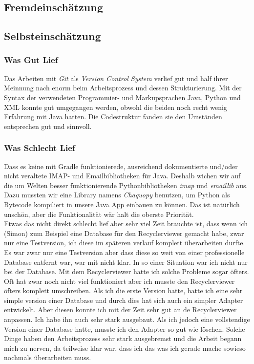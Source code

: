 \documentclass[a4paper,11pt]{article}
\begin{document}
\subsection{Fremdeinschätzung}
\subsection{Selbsteinschätzung}
\subsubsection{Was Gut Lief}
Das Arbeiten mit \textit{Git} als \textit{Version Control System} verlief gut und half ihrer Meinnung nach enorm beim Arbeitsprozess und dessen Strukturierung. Mit der Syntax der verwendeten Programmier- und Markupsprachen Java, Python und XML konnte gut umgegangen werden, obwohl die beiden noch recht wenig Erfahrung mit Java hatten. Die Codestruktur fanden sie den Umständen entsprechen gut und sinnvoll.
\subsubsection{Was Schlecht Lief}
Dass es keine mit Gradle funktionierede, ausreichend dokumentierte und/oder nicht veraltete IMAP- und Emailbibliotheken für Java. Deshalb wichen wir auf die um Welten besser funktionierende Pythonbibliotheken \textit{imap} und \textit{emaillib} aus. Dazu mussten wir eine Library namens \textit{Chaquopy} benutzen, um Python als Bytecode kompiliert in unsere Java App einbauen zu können. Das ist natürlich unschön, aber die Funktionalität wär halt die oberste Priorität.\\

Etwas das nicht direkt schlecht lief aber sehr viel Zeit brauchte ist, dass wenn ich (Simon) zum Beispiel eine Database für den Recyclerviewer gemacht habe, zwar nur eine Testversion, 
ich diese im späteren verlauf komplett überarbeiten durfte. Es war zwar nur eine Testversion aber dass diese so weit von einer professionelle Database entfernt war, war mit nicht klar. 
In so einer Situation war ich nicht nur bei der Database. Mit dem Recyclerviewer hatte ich solche Probleme sogar öfters. Oft hat zwar noch nicht viel funktioniert aber ich musste den Recyclerviewer
öfters komplett umschreiben. Als ich die erste Version hatte, hatte ich eine sehr simple version einer Database und durch dies hat sich auch ein simpler Adapter entwickelt. 
Aber diesen konnte ich mit der Zeit sehr gut an de Recyclerviewer anpassen. Ich habe ihn auch sehr stark ausgebaut. Als ich jedoch eine vollstendige Version einer Database hatte, musste ich den 
Adapter so gut wie löschen. Solche Dinge haben den Arbeitsprozess sehr stark ausgebremst und die Arbeit begann mich zu nerven, da teilweise klar war, dass ich das was ich gerade
mache sowieso nochmals überarbeiten muss. 
\end{document}

